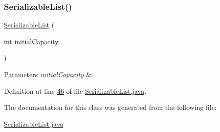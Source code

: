 \subsubsection{\texorpdfstring{Serializable\+List()}{SerializableList()}\hspace{0.1cm}{\footnotesize\ttfamily [3/3]}}
{\footnotesize\ttfamily \hyperlink{classdata_1_1_serializable_list}{Serializable\+List} (\begin{DoxyParamCaption}\item[{int}]{initial\+Capacity }\end{DoxyParamCaption})}


\begin{DoxyParams}{Parameters}
{\em initial\+Capacity} & \\
\hline
\end{DoxyParams}


Definition at line \hyperlink{_serializable_list_8java_source_l00046}{46} of file \hyperlink{_serializable_list_8java_source}{Serializable\+List.\+java}.



The documentation for this class was generated from the following file\+:\begin{DoxyCompactItemize}
\item 
\hyperlink{_serializable_list_8java}{Serializable\+List.\+java}\end{DoxyCompactItemize}
